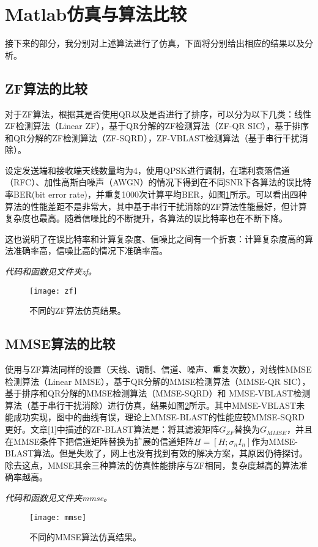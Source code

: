 \section{Matlab仿真与算法比较}
接下来的部分，我分别对上述算法进行了仿真，下面将分别给出相应的结果以及分析。
\subsection{ZF算法的比较}
对于ZF算法，根据其是否使用QR以及是否进行了排序，可以分为以下几类：线性ZF检测算法（Linear ZF），基于QR分解的ZF检测算法（ZF-QR SIC），基于排序和QR分解的ZF检测算法（ZF-SQRD），ZF-VBLAST检测算法（基于串行干扰消除）。\par
设定发送端和接收端天线数量均为4，使用QPSK进行调制，在瑞利衰落信道（RFC）、加性高斯白噪声（AWGN）的情况下得到在不同SNR下各算法的误比特率BER(bit error rate)，并重复1000次计算平均BER，如图\ref{zf}所示。可以看出四种算法的性能差距不是非常大，其中基于串行干扰消除的ZF算法性能最好，但计算复杂度也最高。随着信噪比的不断提升，各算法的误比特率也在不断下降。\par
这也说明了在误比特率和计算复杂度、信噪比之间有一个折衷：计算复杂度高的算法准确率高，信噪比高的情况下准确率高。\par
\textit{代码和函数见文件夹zf。}
\begin{figure}[H]
\centering
\texttt{[image: zf]}
\caption{不同的ZF算法仿真结果。}
\label{zf}
\end{figure}

\subsection{MMSE算法的比较}
使用与ZF算法同样的设置（天线、调制、信道、噪声、重复次数），对线性MMSE检测算法（Linear MMSE），基于QR分解的MMSE检测算法（MMSE-QR SIC），基于排序和QR分解的MMSE检测算法（MMSE-SQRD）和	MMSE-VBLAST检测算法（基于串行干扰消除）进行仿真，结果如图\ref{mmse}所示。其中MMSE-VBLAST未能成功实现，图中的曲线有误，理论上MMSE-BLAST的性能应较MMSE-SQRD更好。文章[1]中描述的ZF-BLAST算法是：将其滤波矩阵$G_{ZF}$替换为$G_{MMSE}$，并且在MMSE条件下把信道矩阵替换为扩展的信道矩阵$\underline{H}=[H;\sigma_nI_n]$作为MMSE-BLAST算法。但是失败了，网上也没有找到有效的解决方案，其原因仍待探讨。除去这点，MMSE其余三种算法的仿真性能排序与ZF相同，复杂度越高的算法准确率越高。\par
\textit{代码和函数见文件夹mmse。}
\begin{figure}[H]
\centering
\texttt{[image: mmse]}
\caption{不同的MMSE算法仿真结果。}
\label{mmse}
\end{figure}


